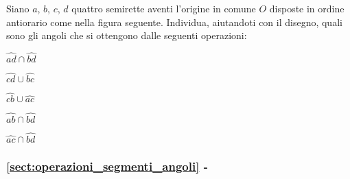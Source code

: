 \begin{esercizio}
\label{ese:1.65}
Siano \(a\), \(b\), \(c\), \(d\) quattro semirette aventi l'origine in comune 
\(O\) disposte in ordine antiorario come nella figura seguente. 
Individua, aiutandoti con il disegno, quali 
sono gli angoli che si ottengono dalle seguenti operazioni:
\noindent \begin{multicols}{5}
\noindent \begin{enumeratea}
\item \(\widehat{ad} \cap \widehat{bd}\)
 
\item \(\widehat{cd} \cup \widehat{bc}\)
 
\item \(\widehat{cb} \cup \widehat{ac}\)
 
\item \(\widehat{ab} \cap \widehat{bd}\)
 
\item \(\widehat{ac} \cap \widehat{bd}\)
 
\end{enumeratea}
\end{multicols}
\end{esercizio}



\begingroup
\hypersetup{linkcolor=black}
\subsubsection*{\ref{sect:operazioni_segmenti_angoli} - 
}
\endgroup

